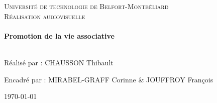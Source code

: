 \begin{sffamily}
\begin{center}
            \vspace{1cm}

            \textsc{\LARGE Université de technologie de Belfort-Montbéliard}\\[2cm]

            \textsc{\Large Réalisation audiovisuelle}\\[1cm]

            {\color{UTBMcolor}\HRule} \\[0.4cm]
            { \huge \bfseries Promotion de la vie associative\\[0.4cm] }
            {\color{UTBMcolor}\HRule} \\[1,5cm]



            \begin{center}
                Réalisé par : CHAUSSON Thibault
    
                \vspace{0,5cm}
                
                Encadré par : MIRABEL-GRAFF Corinne \& JOUFFROY François
            \end{center}




            \vfill

            \textsc{\large \today}

        \end{center}
    \end{sffamily}

